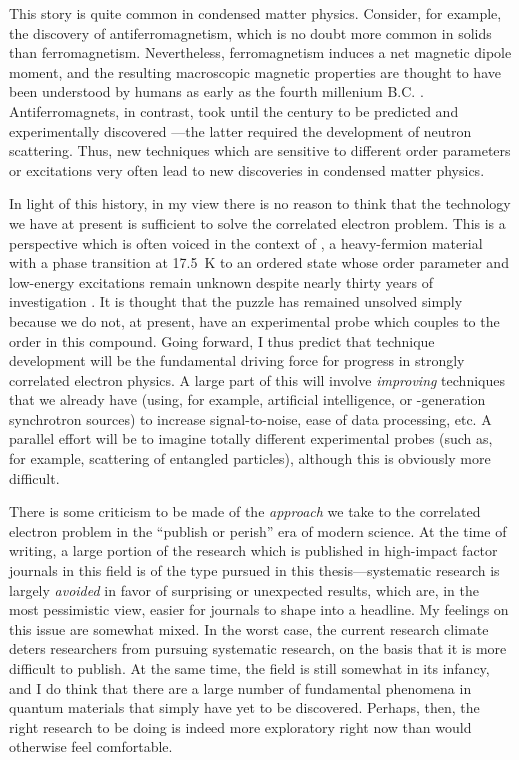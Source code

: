 This story is quite common in condensed matter physics.
Consider, for example, the discovery of antiferromagnetism, which is no doubt more common in solids than ferromagnetism.
Nevertheless, ferromagnetism induces a net magnetic dipole moment, and the resulting macroscopic magnetic properties are thought to have been understood by humans as early as the fourth millenium B.C. \citep{magnetism_fundamentals}.
Antiferromagnets, in contrast, took until the  century to be predicted \citep{neel_properties_1948} and experimentally discovered \citep{shull_neutron_1951}---the latter required the development of neutron scattering.
Thus, new techniques which are sensitive to different order parameters or excitations very often lead to new discoveries in condensed matter physics.

In light of this history, in my view there is no reason to think that the technology we have at present is sufficient to solve the correlated electron problem.
This is a perspective which is often voiced in the context of , a heavy-fermion material with a phase transition at \qty{17.5}{K} to an ordered state whose order parameter and low-energy excitations remain unknown despite nearly thirty years of investigation \citep{palstra_superconducting_1985}.
It is thought \citep{alexandradinata_future_2022} that the puzzle has remained unsolved simply because we do not, at present, have an experimental probe which couples to the order in this compound.
Going forward, I thus predict that technique development will be the fundamental driving force for progress in strongly correlated electron physics.
A large part of this will involve \emph{improving} techniques that we already have (using, for example, artificial intelligence, or -generation synchrotron sources) to increase signal-to-noise, ease of data processing, etc.
A parallel effort will be to imagine totally different experimental probes (such as, for example, scattering of entangled particles\citep{shen_unveiling_2020}), although this is obviously more difficult.

There is some criticism to be made of the \emph{approach} we take to the correlated electron problem in the ``publish or perish'' era of modern science.
At the time of writing, a large portion of the research which is published in high-impact factor journals in this field is of the type pursued in this thesis---systematic research is largely \emph{avoided} in favor of surprising or unexpected results, which are, in the most pessimistic view, easier for journals to shape into a headline.
My feelings on this issue are somewhat mixed.
In the worst case, the current research climate deters researchers from pursuing systematic research, on the basis that it is more difficult to publish.
At the same time, the field is still somewhat in its infancy, and I do think that there are a large number of fundamental phenomena in quantum materials that simply have yet to be discovered.
Perhaps, then, the right research to be doing is indeed more exploratory right now than would otherwise feel comfortable.

